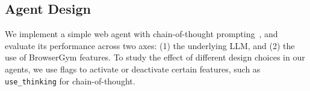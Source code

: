 \documentclass{article}
\theoremstyle{plain}
\theoremstyle{definition}
\theoremstyle{remark}
\begin{document}
\begin{table}[ht]
\caption{Best agent configuration for each LLM, after a random search on MiniWoB and WorkArena.}
\noindent{}
\label{tab:best-agent-configs}
\end{table}

\subsection{Agent Design}\label{sec:agent-design}

We implement a simple web agent with chain-of-thought prompting~\citep{wei22cot}, and evaluate its performance across two axes: (1) the underlying LLM, and (2) the use of BrowserGym features. To study the effect of different design choices in our agents, we use flags to activate or deactivate certain features, such as \texttt{use\_thinking} for chain-of-thought.
\end{document}
